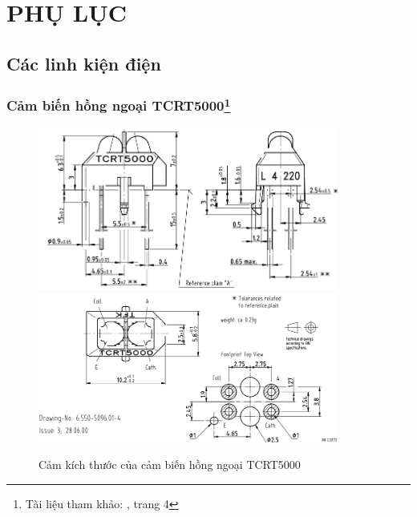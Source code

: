 \chapter*{PHỤ LỤC}
\setcounter{figure}{0}
\setcounter{table}{0}
\thispagestyle{fancy}
\renewcommand{\thefigure}{A.\arabic{figure}}
\renewcommand{\thetable}{A.\arabic{table}}
    \section{Các linh kiện điện}
        \subsection[Cảm biến hồng ngoại TCRT5000]{Cảm biến hồng ngoại TCRT5000\footnote{Tài liệu tham khảo: \cite{vishay_tcrt5000_1}, trang 4}}
            \begin{figure}[H]
                \centering
                \includegraphics[width=0.88\textwidth]{pictures/appendix/app_p1_TCRT5000Dimensions1.png}
                \includegraphics[width=0.88\textwidth]{pictures/appendix/app_p2_TCRT5000Dimensions2.png}
                \caption{Cảm kích thước của cảm biến hồng ngoại TCRT5000}
                \label{fig:TCRT5000}
            \end{figure}
